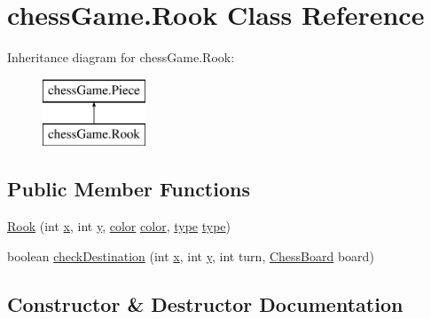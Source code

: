 \hypertarget{classchess_game_1_1_rook}{}\section{chess\+Game.\+Rook Class Reference}
\label{classchess_game_1_1_rook}
Inheritance diagram for chess\+Game.\+Rook\+:\begin{figure}[H]
\begin{center}
\leavevmode
\includegraphics[height=2.000000cm]{classchess_game_1_1_rook}
\end{center}
\end{figure}
\subsection*{Public Member Functions}
\begin{DoxyCompactItemize}
\item 
\hyperlink{classchess_game_1_1_rook_ab18090f0e1c42f60f3e0a89fdf599843}{Rook} (int \hyperlink{classchess_game_1_1_piece_aeb2d3374492005d799aa6b7b85be40e7}{x}, int \hyperlink{classchess_game_1_1_piece_a56e4d8d18eca3fd03a6bd5d6112d6359}{y}, \hyperlink{classchess_game_1_1_piece_ad5117cbbbaebf3a27c4f3c2bcbd6678b}{color} \hyperlink{classchess_game_1_1_piece_ad5117cbbbaebf3a27c4f3c2bcbd6678b}{color}, \hyperlink{classchess_game_1_1_piece_a1370c7f61581a1b72fa8ac2fd1af70a2}{type} \hyperlink{classchess_game_1_1_piece_a1370c7f61581a1b72fa8ac2fd1af70a2}{type})
\item 
boolean \hyperlink{classchess_game_1_1_rook_a8b9521d22b59e973c8bbd1e36dd70977}{check\+Destination} (int \hyperlink{classchess_game_1_1_piece_aeb2d3374492005d799aa6b7b85be40e7}{x}, int \hyperlink{classchess_game_1_1_piece_a56e4d8d18eca3fd03a6bd5d6112d6359}{y}, int turn, \hyperlink{classchess_game_1_1_chess_board}{Chess\+Board} board)
\end{DoxyCompactItemize}


\subsection{Constructor \& Destructor Documentation}
\hypertarget{classchess_game_1_1_rook_ab18090f0e1c42f60f3e0a89fdf599843}{}\label{classchess_game_1_1_rook_ab18090f0e1c42f60f3e0a89fdf599843} 
